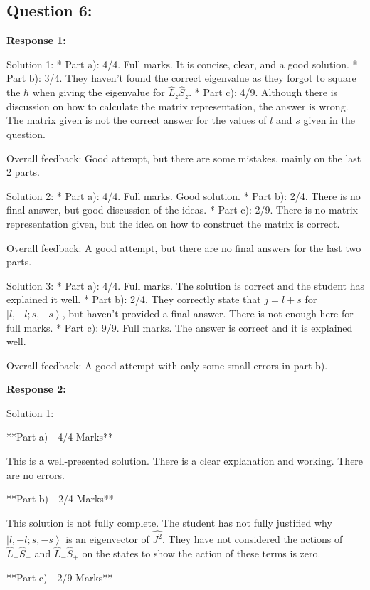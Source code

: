 \documentclass[a4paper,11pt]{article}
\begin{document}
\subsection*{Question 6:}

\textbf{Response 1:}

Solution 1: 
* Part a): 4/4. Full marks. It is concise, clear, and a good solution.
* Part b): 3/4. They haven't found the correct eigenvalue as they forgot to square the \(\hbar\) when giving the eigenvalue for \(\hat{L}_z \hat{S}_z\).
* Part c): 4/9. Although there is discussion on how to calculate the matrix representation, the answer is wrong. The matrix given is not the correct answer for the values of \(l\) and \(s\) given in the question. 

Overall feedback: Good attempt, but there are some mistakes, mainly on the last 2 parts.

Solution 2: 
* Part a): 4/4. Full marks. Good solution.
* Part b): 2/4. There is no final answer, but good discussion of the ideas.
* Part c): 2/9. There is no matrix representation given, but the idea on how to construct the matrix is correct.

Overall feedback: A good attempt, but there are no final answers for the last two parts.

Solution 3:
* Part a): 4/4. Full marks. The solution is correct and the student has explained it well.
* Part b): 2/4. They correctly state that \(j = l + s\) for \( \left|l, -l; s, -s \right>\), but haven't provided a final answer. There is not enough here for full marks.
* Part c): 9/9. Full marks. The answer is correct and it is explained well.

Overall feedback: A good attempt with only some small errors in part b). 

\bigskip    
\textbf{Response 2:}

Solution 1:

**Part a) - 4/4 Marks**

This is a well-presented solution. There is a clear explanation and working. There are no errors. 

**Part b) - 2/4 Marks**

This solution is not fully complete. The student has not fully justified why \( \left|l, -l; s, -s \right> \) is an eigenvector of \( \hat{J^2} \). They have not considered the actions of \( \hat{L}_+ \hat{S}_- \) and \( \hat{L}_- \hat{S}_+ \) on the states to show the action of these terms is zero. 

**Part c) - 2/9 Marks**
\end{document}
